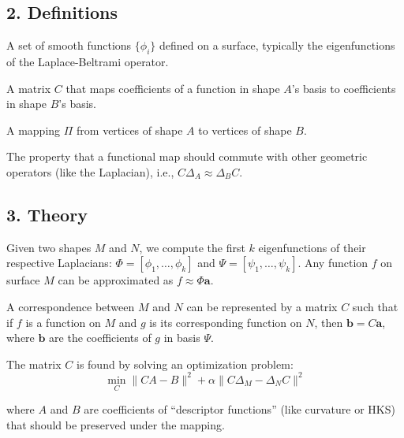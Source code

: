 \subsection{2. Definitions}

\begin{definition}\label{def:basis_functions_fm}
A set of smooth functions $\{\phi_i\}$ defined on a surface, typically the eigenfunctions of the Laplace-Beltrami operator.
\end{definition}

\begin{definition}\label{def:functional_map}
A matrix $C$ that maps coefficients of a function in shape $A$'s basis to coefficients in shape $B$'s basis.
\end{definition}

\begin{definition}[Correspondence]\label{def:correspondence}
A mapping $\Pi$ from vertices of shape $A$ to vertices of shape $B$.
\end{definition}

\begin{definition}[Commutativity]\label{def:commutativity}
The property that a functional map should commute with other geometric operators (like the Laplacian), i.e., $C \Delta_A \approx \Delta_B C$.
\end{definition}

\subsection{3. Theory}

Given two shapes $M$ and $N$, we compute the first $k$ eigenfunctions of their respective Laplacians: $\Phi = [\phi_1, \dots, \phi_k]$ and $\Psi = [\psi_1, \dots, \psi_k]$. Any function $f$ on surface $M$ can be approximated as $f \approx \Phi \mathbf{a}$.

A correspondence between $M$ and $N$ can be represented by a matrix $C$ such that if $f$ is a function on $M$ and $g$ is its corresponding function on $N$, then $\mathbf{b} = C \mathbf{a}$, where $\mathbf{b}$ are the coefficients of $g$ in basis $\Psi$.

The matrix $C$ is found by solving an optimization problem:
$$\min_C \| C A - B \|^2 + \alpha \| C \Delta_M - \Delta_N C \|^2$$

where $A$ and $B$ are coefficients of ``descriptor functions'' (like curvature or HKS\cite{coifman2006}) that should be preserved under the mapping.

